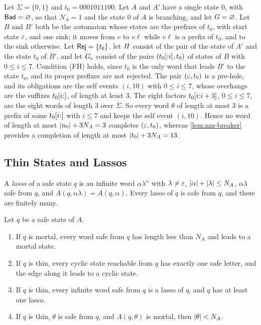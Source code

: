 \begin{example}\label{ex:nm-max}
Let $\Sigma=\{0,1\}$ and $t_0=0001011100$. Let $A$ and $A'$ have a single state
$0$, with $\mathsf{Bad}=\varnothing$, so that $N_A=1$ and the state $0$ of $A$ is
branching, and let $G=\varnothing$. Let $B$ and $B'$ both be the automaton
whose states are the prefixes of $t_0$, with start state $\varepsilon$, and one sink;
it moves from $v$ to $v\ell$ while $v\ell$ is a prefix of $t_0$, and to the
sink otherwise. Let $\mathsf{Rej}=\{t_0\}$, let $H$ consist of the pair of the
state of $A'$ and the state $t_0$ of $B'$, and let $G_{\mathrm{s}}$ consist of the
pairs $(t_0[{:}i],t_0)$ of states of $B$ with $0\le i\le7$. Condition (FH)
holds, since $t_0$ is the only word that leads $B'$ to the state $t_0$, and
its proper prefixes are not rejected. The pair $(\varepsilon,t_0)$ is a pre-hole, and
its obligations are the self events $(i,10)$ with $0\le i\le7$, whose
overhangs are the suffixes $t_0[i{:}]$, of length at least $3$. The eight
factors $t_0[i{:}i+3]$, $0\le i\le7$, are the eight words of length $3$
over $\Sigma$. So every word $\theta$ of length at most $3$ is a prefix of some
$t_0[i{:}]$ with $i\le7$ and keeps the self event $(i,10)$. Hence no word of
length at most $\lvert u_0\rvert+3N_A=3$ completes $(\varepsilon,t_0)$, whereas
\cref{lem:nm-breaker} provides a completion of length at most
$\lvert t_0\rvert+3N_A=13$.
\end{example}

\subsection{Thin States and Lassos}\label{sec:nm-thin}

A \emph{lasso} of a safe state $q$ is an infinite word $\alpha\lambda^\omega$
with $\lambda\ne\varepsilon$, $\lvert \alpha\rvert+\lvert \lambda\rvert\le N_A$, $\alpha\lambda$ safe
from $q$, and $A(q,\alpha\lambda)=A(q,\alpha)$. Every lasso of $q$ is safe from
$q$, and there are finitely many.

\begin{lemma}\label{lem:nm-thin}
Let $q$ be a safe state of $A$.
\begin{enumerate}[label=(\alph*)]
\item If $q$ is mortal, every word safe from $q$ has length less than $N_A$
and leads to a mortal state.
\item If $q$ is thin, every cyclic state reachable from $q$ has exactly one
safe letter, and the edge along it leads to a cyclic state.
\item If $q$ is thin, every infinite word safe from $q$ is a lasso of $q$, and
$q$ has at least one lasso.
\item If $q$ is thin, $\theta$ is safe from $q$, and $A(q,\theta)$ is mortal,
then $\lvert \theta\rvert<N_A$.
\end{enumerate}
\end{lemma}

